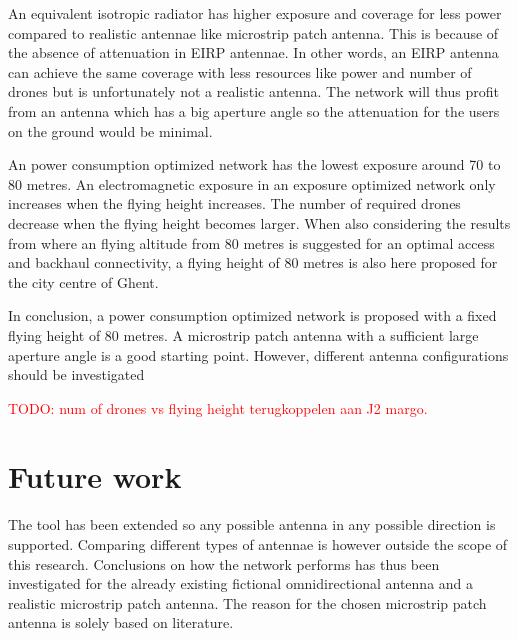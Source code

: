 An equivalent isotropic radiator has higher exposure and coverage for less power compared to realistic antennae like microstrip patch antenna.
This is because  of the absence of attenuation in \gls{EIRP} antennae. In other words, an \gls{EIRP} antenna can achieve the same coverage with less
resources like power and number of drones but is unfortunately not a realistic antenna. The network will thus profit from an antenna which has a big 
aperture angle so the attenuation for the users on the ground would be minimal.


An power consumption optimized network has the lowest exposure around 70 to 80 metres. An electromagnetic exposure in an 
exposure optimized network only increases when the flying height increases. The number of required drones decrease 
when the flying height becomes larger. When also considering the results from \cite{J27_backhaul} where an flying altitude from 
80 metres is suggested for an optimal access and backhaul connectivity, a flying height 
of 80 metres is also here proposed for the city centre of Ghent.

In conclusion, a power consumption optimized network is proposed with a fixed flying height of 80 metres. A microstrip patch 
antenna with a sufficient large aperture angle is a good starting point. However, different antenna configurations should 
be investigated 

\textcolor{red}{TODO: num of drones vs flying height terugkoppelen aan J2 margo.}

\section{Future work}
The tool has been extended so any possible antenna in any possible direction is supported. Comparing different types 
of antennae is however outside the scope of this research.
Conclusions on how the network performs has thus been investigated for the already existing fictional omnidirectional antenna and a 
realistic microstrip patch antenna. The reason for the chosen microstrip patch antenna is solely based on literature.

